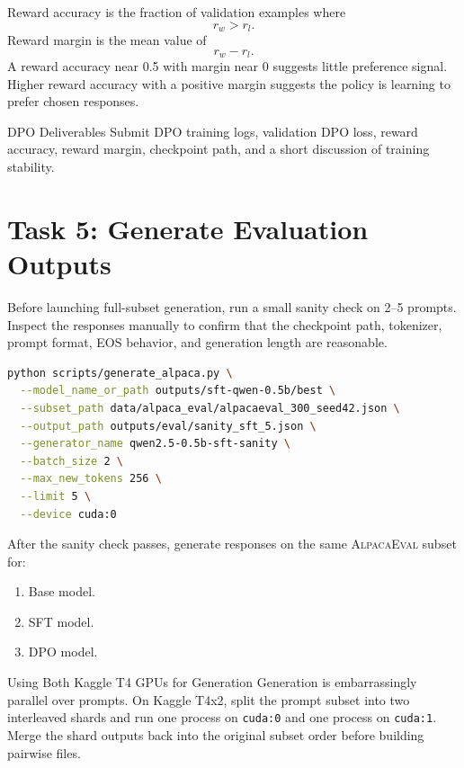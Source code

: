\documentclass[11pt]{article}
\newcommand{\alpaca}{\textsc{AlpacaEval}}
\begin{document}
Reward accuracy is the fraction of validation examples where
\begin{equation}
  r_w > r_l.
\end{equation}
Reward margin is the mean value of
\begin{equation}
  r_w - r_l.
\end{equation}
A reward accuracy near 0.5 with margin near 0 suggests little preference signal. Higher reward accuracy with a positive margin suggests the policy is learning to prefer chosen responses.

\begin{deliverablebox}{DPO Deliverables}
Submit DPO training logs, validation DPO loss, reward accuracy, reward margin, checkpoint path, and a short discussion of training stability.
\end{deliverablebox}

\section{Task 5: Generate Evaluation Outputs}
Before launching full-subset generation, run a small sanity check on 2--5 prompts. Inspect the responses manually to confirm that the checkpoint path, tokenizer, prompt format, EOS behavior, and generation length are reasonable.

\begin{lstlisting}[language=bash]
python scripts/generate_alpaca.py \
  --model_name_or_path outputs/sft-qwen-0.5b/best \
  --subset_path data/alpaca_eval/alpacaeval_300_seed42.json \
  --output_path outputs/eval/sanity_sft_5.json \
  --generator_name qwen2.5-0.5b-sft-sanity \
  --batch_size 2 \
  --max_new_tokens 256 \
  --limit 5 \
  --device cuda:0
\end{lstlisting}

After the sanity check passes, generate responses on the same \alpaca{} subset for:
\begin{enumerate}[leftmargin=*]
  \item Base model.
  \item SFT model.
  \item DPO model.
\end{enumerate}

\begin{infobox}{Using Both Kaggle T4 GPUs for Generation}
Generation is embarrassingly parallel over prompts. On Kaggle T4x2, split the prompt subset into two interleaved shards and run one process on \texttt{cuda:0} and one process on \texttt{cuda:1}. Merge the shard outputs back into the original subset order before building pairwise files.
\end{infobox}
\end{document}
